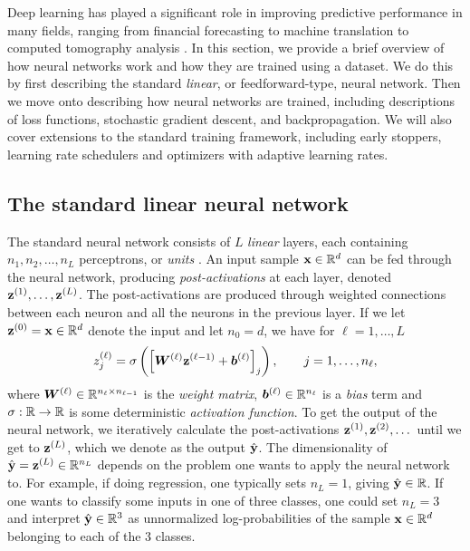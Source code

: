 \documentclass{statsmsc}
\begin{document}
{%

Deep learning has played a significant role in improving predictive performance in many fields,
ranging from financial forecasting \citep{dain,rdain,bin} to machine
translation \citep{gru_cho,attention} to computed tomography analysis
\citep{mixture_ct}. In this section, we provide a brief overview of how neural networks work and
how they are trained using a dataset. We do this by first describing the standard \textit{linear},
or feedforward-type, neural network. Then we move onto describing how neural networks are trained,
including descriptions of loss functions, stochastic gradient descent, and backpropagation. We will
also cover extensions to the standard training framework, including early stoppers, learning
rate schedulers and optimizers with adaptive learning rates.

\subsection{The standard linear neural network}%
\label{sub:The standard linear neural network}

The standard neural network consists of $L$ \textit{linear} layers, each containing
$n_1,n_2,\dots,n_L$ perceptrons, or \textit{units} \citep{dnn}. An input sample $\mathbf{x} \in \mathbb{R}^d$ can be fed
through the neural network, producing \textit{post-activations} at each layer, denoted
$\mathbf{z}^{(1)}, \dots, \mathbf{z}^{(L)}$. The post-activations are produced through weighted
connections between each neuron and all the neurons in the previous layer. If we let
$\mathbf{z}^{(0)}=\mathbf{x} \in \mathbb{R}^d$ denote the input and let $n_0=d$, we have for $\ell=1,\dots,L$
\begin{equation}\label{eq:nn_update}
    z_j^{(\ell)} = \sigma \left(\left[ \boldsymbol{W}^{(\ell)} \mathbf{z}^{(\ell-1)} + \boldsymbol{b}^{(\ell)} \right]_j \right),\qquad j=1,\dots,n_\ell,
\end{equation}
where $\boldsymbol{W}^{(\ell)} \in \mathbb{R}^{n_{\ell} \times n_{\ell-1}}$ is the \textit{weight matrix},
$\boldsymbol{b}^{(\ell)} \in \mathbb{R}^{n_{\ell}}$ is a \textit{bias} term and
$\sigma : \mathbb{R} \rightarrow {\mathbb{R}}$ is some deterministic \textit{activation function}.
To get the output of the neural network, we iteratively calculate the post-activations
$\mathbf{z}^{(1)},\mathbf{z}^{(2)},\dots$ until we get to $\mathbf{z}^{(L)}$, which we denote as the output
$\hat{\mathbf{y}}$. The dimensionality of $\hat{\mathbf{y}}=\mathbf{z}^{(L)} \in \mathbb{R}^{n_L}$
depends on the problem one wants
to apply the neural network to. For example, if doing regression, one typically sets
$n_L=1$, giving $\hat{\mathbf{y}} \in \mathbb{R}$. If one wants to classify some inputs in one of three classes,
one could set $n_L=3$ and interpret $\hat{\mathbf{y}} \in \mathbb{R}^3$ as unnormalized log-probabilities of
the sample $\mathbf{x} \in \mathbb{R}^d$ belonging to each of the 3 classes.

}
\end{document}
